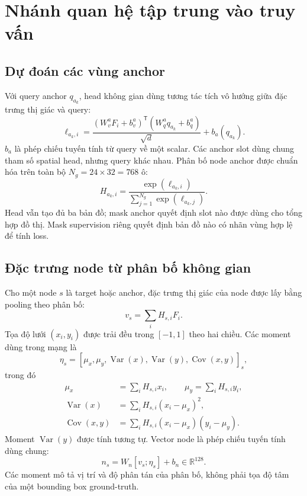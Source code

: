 \section{Nhánh quan hệ tập trung vào truy vấn}
\label{sec:method-relation-head}

\subsection{Dự đoán các vùng anchor}

Với query anchor $q_{a_k}$, head không gian dùng tương tác tích vô hướng
giữa đặc trưng thị giác và query:
\begin{equation}
    \ell_{a_k,i}=
    \frac{(W_v^a F_i+b_v^a)^{\mathsf T}
    (W_q^a q_{a_k}+b_q^a)}{\sqrt{d}}
    +b_a(q_{a_k}).
    \label{eq:method-anchor-logit}
\end{equation}
$b_a$ là phép chiếu tuyến tính từ query về một scalar.
Các anchor slot dùng chung tham số spatial head, nhưng query khác nhau.
Phân bố node anchor được chuẩn hóa trên toàn bộ $N_g=24\times32=768$ ô:
\begin{equation}
    H_{a_k,i}=
    \frac{\exp(\ell_{a_k,i})}
    {\sum_{j=1}^{N_g}\exp(\ell_{a_k,j})}.
\end{equation}
Head vẫn tạo đủ ba bản đồ; mask anchor quyết định slot nào được dùng
cho tổng hợp đồ thị. Mask supervision riêng quyết định bản đồ nào
có nhãn vùng hợp lệ để tính loss.

\subsection{Đặc trưng node từ phân bố không gian}

Cho một node $s$ là target hoặc anchor, đặc trưng thị giác của node
được lấy bằng pooling theo phân bố:
\begin{equation}
    v_s=\sum_i H_{s,i}F_i.
\end{equation}
Tọa độ lưới $(x_i,y_i)$ được trải đều trong $[-1,1]$ theo hai chiều.
Các moment dùng trong mạng là
\begin{equation}
    \eta_s=
    [\mu_x,\mu_y,\operatorname{Var}(x),
    \operatorname{Var}(y),\operatorname{Cov}(x,y)]_s,
\end{equation}
trong đó
\begin{align}
    \mu_x&=\sum_i H_{s,i}x_i,\qquad
    \mu_y=\sum_i H_{s,i}y_i,\\
    \operatorname{Var}(x)&=\sum_i H_{s,i}(x_i-\mu_x)^2,\\
    \operatorname{Cov}(x,y)&=
    \sum_i H_{s,i}(x_i-\mu_x)(y_i-\mu_y).
\end{align}
Moment $\operatorname{Var}(y)$ được tính tương tự.
Vector node là phép chiếu tuyến tính dùng chung:
\begin{equation}
    n_s=W_n[v_s;\eta_s]+b_n\in\mathbb{R}^{128}.
\end{equation}
Các moment mô tả vị trí và độ phân tán của phân bố, không phải
tọa độ tâm của một bounding box ground-truth.


